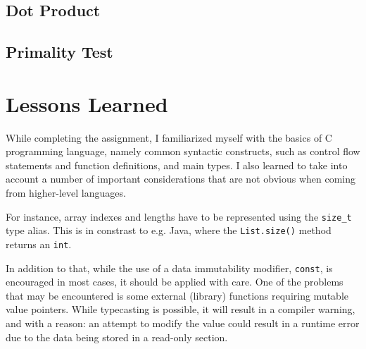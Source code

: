 \documentclass[en, listings]{labreport}
\begin{document}
\subsection*{Dot Product}



\subsection*{Primality Test}



\section*{Lessons Learned}

While completing the assignment, I familiarized myself with the 
basics of C programming language, namely common syntactic constructs,
such as control flow statements and function definitions, 
and main types. I also learned to take into account a number of important
considerations that are not obvious when coming from higher-level languages.

For instance, array indexes and lengths have to be represented using
the \texttt{size\_t} type alias. This is in constrast to e.g. Java,
where the \texttt{List.size()} method returns an \texttt{int}.

In addition to that, while the use of a data immutability modifier,
\texttt{const}, is encouraged in most cases, it should be applied with care.
One of the problems that may be encountered is some external (library) functions
requiring mutable value pointers. While typecasting is possible, it will
result in a compiler warning, and with a reason: an attempt to modify the value
could result in a runtime error due to the data being stored in a read-only section.
\end{document}
